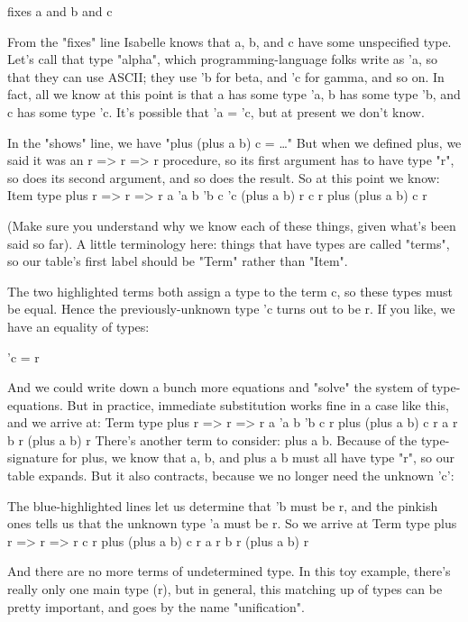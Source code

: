 fixes a and b and c

From the "fixes" line Isabelle knows that a, b, and c have some unspecified type. Let's call that type "alpha", which programming-language folks write as 'a, so that they can use ASCII; they use 'b for beta, and 'c for gamma, and so on. In fact, all we know at this point is that a has some type 'a, b has some type 'b, and c has some type 'c. It's possible that 'a = 'c, but at present we don't know. 

In the "shows" line, we have "plus (plus a b) c = …" But when we defined plus, we said it was an r => r => r procedure, so its first argument has to have type "r", so does its second argument, and so does the result. So at this point we know:
Item              type
plus                r => r => r
a                  'a
b                  'b
c                  'c
(plus a b)          r
c                   r
plus (plus a b) c   r    

(Make sure you understand why we know each of these things, given what's been said so far). A little terminology here: things that have types are called "terms", so our table's first label should be "Term" rather than "Item". 

The two highlighted terms both assign a type to the term c, so these types must be equal. Hence the previously-unknown type 'c turns out to be r. If you like, we have an equality of types: 


'c = r

And we could write down a bunch more equations and "solve" the system of type-equations. But in practice, immediate substitution works fine in a case like this, and we arrive at:
Term              type
plus                r => r => r
a                  'a
b                  'b
c                   r
plus (plus a b) c   r    
a                   r
b                   r
(plus a b)          r
There's another term to consider: plus a b. Because of the type-signature for plus, we know that a, b, and plus a b must all have type "r", so our table expands. But it also contracts, because we no longer need the unknown 'c':

The blue-highlighted lines let us determine that 'b must be r, and the pinkish ones tells us that the unknown type 'a must be r. So we arrive at 
Term              type
plus                r => r => r
c                   r
plus (plus a b) c   r    
a                   r
b                   r
(plus a b)          r

And there are no more terms of undetermined type. In this toy example, there's really only one main type (r), but in general, this matching up of types can be pretty important, and goes by the name "unification". 

